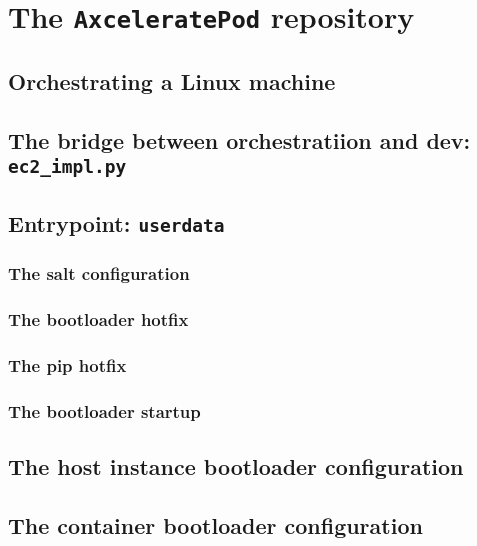\chapter{The \texttt{AxceleratePod} repository}
	\section{Orchestrating a Linux machine}
	\section{The bridge between orchestratiion and dev: \texttt{ec2\_impl.py}}
	\section{Entrypoint: \texttt{userdata}}
		\subsection{The salt configuration}
		\subsection{The bootloader hotfix}
		\subsection{The pip hotfix}
		\subsection{The bootloader startup}
	\section{The host instance bootloader configuration}
	\section{The container bootloader configuration}